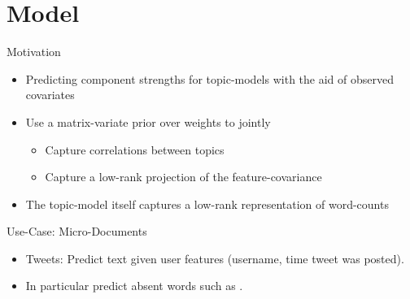 \documentclass[xcolor=dvipsnames]{beamer}
\newcommand \vecf[1] {
    \text{vec}\left(#1\right)
}
\newcommand \halve[1] {
	\frac{#1}{2}
}
\newcommand \half {
    \halve{1}
}
\newcommand \tr { \text{tr} }
\newcommand \T { ^\top }
\newcommand \nor[2]   { \mathcal{N} \left( {#1}, {#2} \right) }
\newcommand \mnor[3]  { \mathcal{N} \left(#1, #2, #3\right) }
\newcommand \Tr[1]   { \tr \left(  {#1}  \right) }
\newcommand \MReal[2] { { \mathbb{R}^{#1 \times #2} } }
\newcommand \inv[1] { {#1}^{-1} }
\begin{document}
%
%
%
%
%
%





\section{Model}
\begin{frame}{Motivation}

\begin{itemize}
    \item Predicting component strengths for topic-models with the aid of observed covariates
    \item Use a matrix-variate prior over weights to jointly
    \begin{itemize}
        \item Capture correlations between topics
        \item Capture a low-rank projection of the feature-covariance      
    \end{itemize}
    \item The topic-model itself captures a low-rank representation of word-counts  
\end{itemize}

\pause
Use-Case: Micro-Documents
\begin{itemize}
    \item Tweets: Predict text given user features (username, time tweet was posted). 
    \pause        
    \item In particular predict absent words such as .
\end{itemize}

\end{frame}
\end{document}
